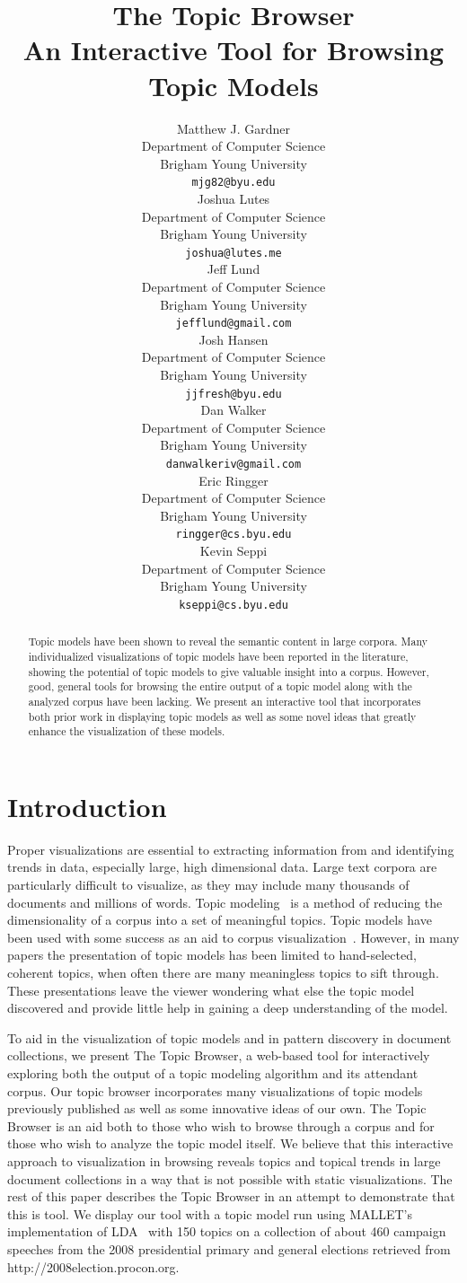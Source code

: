 \documentclass{article}
\title{The Topic Browser\\An Interactive Tool for Browsing Topic Models}
\author{
Matthew J. Gardner \\
Department of Computer Science \\
Brigham Young University \\
\texttt{mjg82@byu.edu} \\
\And
Joshua Lutes \\
Department of Computer Science \\
Brigham Young University \\
\texttt{joshua@lutes.me} \\
\And
Jeff Lund \\
Department of Computer Science \\
Brigham Young University \\
\texttt{jefflund@gmail.com} \\
\And
Josh Hansen \\
Department of Computer Science \\
Brigham Young University \\
\texttt{jjfresh@byu.edu} \\
\And
Dan Walker \\
Department of Computer Science \\
Brigham Young University \\
\texttt{danwalkeriv@gmail.com} \\
\And
Eric Ringger \\
Department of Computer Science \\
Brigham Young University \\
\texttt{ringger@cs.byu.edu} \\
\And
Kevin Seppi \\
Department of Computer Science \\
Brigham Young University \\
\texttt{kseppi@cs.byu.edu} \\
}
\begin{document}
\nipsfinalcopy %
\maketitle

\begin{abstract}

Topic models have been shown to reveal the semantic content in large corpora.
Many individualized visualizations of topic models have been reported in the
literature, showing the potential of topic models to give valuable insight into
a corpus.  However, good, general tools for browsing the entire output of a
topic model along with the analyzed corpus have been lacking.  We present an
interactive tool that incorporates both prior work in displaying topic models
as well as some novel ideas that greatly enhance the visualization of these
models.

\end{abstract}

\section{Introduction}

Proper visualizations are essential to extracting information from and
identifying trends in data, especially large, high dimensional data.  Large
text corpora are particularly difficult to visualize, as they may include many
thousands of documents and millions of words.  Topic
modeling~\cite{blei-2003-latent-dirichlet-allocation} is a method of reducing
the dimensionality of a corpus into a set of meaningful topics.  Topic models
have been used with some success as an aid to corpus
visualization~\cite{blei-2009-topic-models,
newman-2010-visualizing-with-topic-maps}.  However, in many papers the
presentation of topic models has been limited to hand-selected, coherent
topics, when often there are many meaningless topics to sift through.  These
presentations leave the viewer wondering what else the topic model discovered
and provide little help in gaining a deep understanding of the model.

To aid in the visualization of topic models and in pattern discovery in
document collections, we present The Topic Browser, a web-based tool for
interactively exploring both the output of a topic modeling algorithm and its
attendant corpus.  Our topic browser incorporates many visualizations of topic
models previously published as well as some innovative ideas of our own.  The
Topic Browser is an aid both to those who wish to browse through a corpus and
for those who wish to analyze the topic model itself.  We believe that this
interactive approach to visualization in browsing reveals topics and topical
trends in large document collections in a way that is not possible with static
visualizations.  The rest of this paper describes the Topic Browser in an
attempt to demonstrate that this is tool.  We display our tool with a topic
model run using MALLET's implementation of LDA~\cite{mallet} with 150 topics on
a collection of about 460 campaign speeches from the 2008 presidential primary
and general elections retrieved from http://2008election.procon.org.
\end{document}
